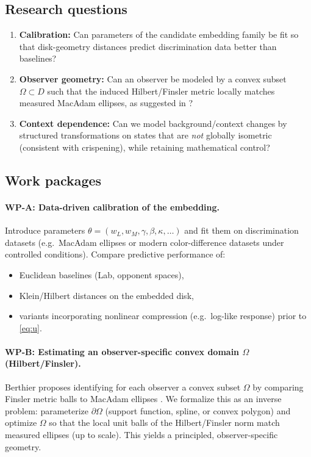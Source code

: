 \documentclass[11pt]{article}
\begin{document}
\subsection{Research questions}
\begin{enumerate}[label=\textbf{RQ\arabic*.}, leftmargin=2.2em]
\item \textbf{Calibration:} Can parameters of the candidate embedding family be fit so that disk-geometry distances predict discrimination data better than baselines?
\item \textbf{Observer geometry:} Can an observer be modeled by a convex subset $\Omega\subset D$ such that the induced Hilbert/Finsler metric locally matches measured MacAdam ellipses, as suggested in \cite{Berthier2020}?
\item \textbf{Context dependence:} Can we model background/context changes by structured transformations on states that are \emph{not} globally isometric (consistent with crispening), while retaining mathematical control?
\end{enumerate}

\subsection{Work packages}

\paragraph{WP-A: Data-driven calibration of the embedding.}
Introduce parameters $\theta=(w_L,w_M,\gamma,\beta,\kappa,\dots)$ and fit them on discrimination datasets (e.g.\ MacAdam ellipses or modern color-difference datasets under controlled conditions).
Compare predictive performance of:
\begin{itemize}[leftmargin=2.2em]
\item Euclidean baselines (Lab, opponent spaces),
\item Klein/Hilbert distances on the embedded disk,
\item variants incorporating nonlinear compression (e.g.\ log-like response) prior to \eqref{eq:u}.
\end{itemize}

\paragraph{WP-B: Estimating an observer-specific convex domain $\Omega$ (Hilbert/Finsler).}
Berthier proposes identifying for each observer a convex subset $\Omega$ by comparing Finsler metric balls to MacAdam ellipses \cite{Berthier2020}.
We formalize this as an inverse problem:
parameterize $\partial\Omega$ (support function, spline, or convex polygon) and optimize $\Omega$ so that the local unit balls of the Hilbert/Finsler norm match measured ellipses (up to scale).
This yields a principled, observer-specific geometry.
\end{document}
